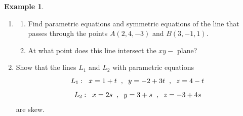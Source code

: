 \documentclass[11pt,a4paper]{article}
\theoremstyle{definition}
\newtheorem{exa}[thm]{Example}
\begin{document}
\begin{exa}
\begin{enumerate}
\item \begin{enumerate}
      \item Find parametric equations and symmetric equations of the line that passes through the points $A(2,4,-3)$ and $B(3,-1,1)$.
      \item At what point does this line intersect the $xy -$ plane?
\end{enumerate}
\item Show that the lines $L_1$ and $L_2$ with parametric equations 
$$L_1 : \hspace{0.2cm} x = 1 + t\hspace{0.2cm} , \hspace{0.2cm} y = -2 + 3t \hspace{0.2cm} , \hspace{0.2cm} z = 4 -t$$
$$L_2 : \hspace{0.2cm} x = 2s \hspace{0.2cm} , \hspace{0.2cm} y = 3 + s \hspace{0.2cm} , \hspace{0.2cm} z = -3 + 4s$$ are skew.
\end{enumerate}
\end{exa}
\end{document}
